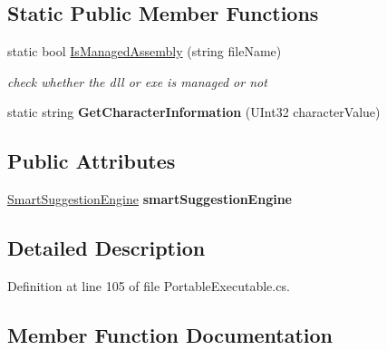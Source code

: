 \subsection*{Static Public Member Functions}
\begin{DoxyCompactItemize}
\item 
static bool \mbox{\hyperlink{class_p_e_d_scanner_lib_1_1_core_1_1_portable_executable_loader_a857cacc5b0680f7fd26ab83c28e8ea13}{Is\+Managed\+Assembly}} (string file\+Name)
\begin{DoxyCompactList}\small\item\em check whether the dll or exe is managed or not \end{DoxyCompactList}\item 
\mbox{\label{class_p_e_d_scanner_lib_1_1_core_1_1_portable_executable_loader_a8dc0dd6bc1f36d4acf68d454ad129781}} 
static string {\bfseries Get\+Character\+Information} (U\+Int32 character\+Value)
\end{DoxyCompactItemize}
\subsection*{Public Attributes}
\begin{DoxyCompactItemize}
\item 
\mbox{\label{class_p_e_d_scanner_lib_1_1_core_1_1_portable_executable_loader_a27c118e26173e30ff80eeb551e582d26}} 
\mbox{\hyperlink{class_p_e_d_scanner_lib_1_1_smart_suggestion_engine}{Smart\+Suggestion\+Engine}} {\bfseries smart\+Suggestion\+Engine}
\end{DoxyCompactItemize}


\subsection{Detailed Description}


Definition at line 105 of file Portable\+Executable.\+cs.



\subsection{Member Function Documentation}
\mbox{\label{class_p_e_d_scanner_lib_1_1_core_1_1_portable_executable_loader_aa558ac645b1c1d45d6ca2de6f11254e2}} 
